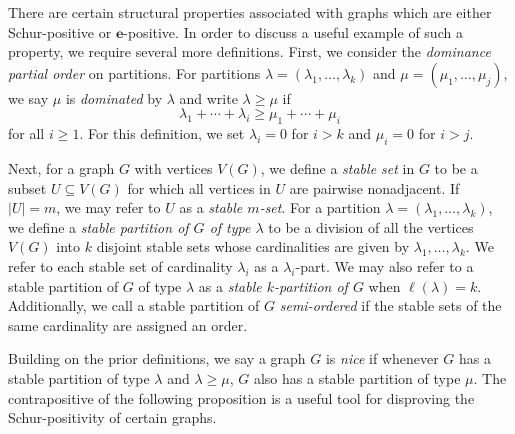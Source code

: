 \documentclass[12pt]{amsart}
\numberwithin{equation}{section}
\theoremstyle{plain}
\theoremstyle{definition}
\theoremstyle{remark}
\begin{document}
There are certain structural properties associated with graphs which are either Schur-positive or $\mathbf{e}$-positive. In order to discuss a useful example of such a property, we require several more definitions. First, we consider the \textit{dominance partial order} on partitions. For partitions $\lambda=(\lambda_1,\dots,\lambda_k)$ and $\mu=(\mu_1,\dots,\mu_j)$, we say $\mu$ is \textit{dominated} by $\lambda$ and write $\lambda \ge \mu$ if
\[\lambda_1+\cdots+\lambda_i \ge \mu_1+\cdots+\mu_i
\]
for all $i\ge 1$. For this definition, we set $\lambda_i=0$ for $i>k$ and $\mu_i=0$ for $i>j$.


Next, for a graph $G$ with vertices $V(G)$, we define a \textit{stable set} in $G$ to be a subset $U \subseteq V(G)$ for which all vertices in $U$ are pairwise nonadjacent. If $|U|=m$, we may refer to $U$ as a \textit{stable $m$-set}. For a partition $\lambda=(\lambda_1,\dots,\lambda_k)$, we define a \textit{stable partition of $G$ of type $\lambda$} to be a division of all the vertices $V(G)$ into $k$ disjoint stable sets whose cardinalities are given by $\lambda_1,\dots,\lambda_k$. We refer to each stable set of cardinality $\lambda_i$ as a $\lambda_i$-part. We may also refer to a stable partition of $G$ of type $\lambda$ as a \textit{stable $k$-partition of $G$} when $\ell(\lambda)=k$. Additionally, we call a stable partition of $G$ \textit{semi-ordered} if the stable sets of the same cardinality are assigned an order.


 

Building on the prior definitions, we say a graph $G$ is \textit{nice} if whenever $G$ has a stable partition of type $\lambda$ and $\lambda\ge \mu$, $G$ also has a stable partition of type $\mu$. The contrapositive of the following proposition is a useful tool for disproving the Schur-positivity of certain graphs.
\end{document}
